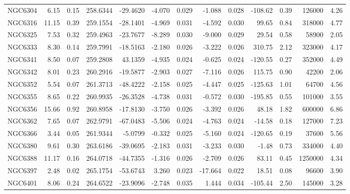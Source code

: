 \begin{longtable}{ | l | r | r| r | r | r | r | r | r | r | r | r | r  |}
            NGC6304       &   6.15 & 0.15 & 258.6344 & -29.4620 &  -4.070 & 0.029 &  -1.088 &  0.028 & -108.62 &  0.39 &  126000 &  4.26\\ 
            NGC6316       &  11.15 & 0.39 & 259.1554 & -28.1401 &  -4.969 & 0.031 &  -4.592 &  0.030 &   99.65 &  0.84 &  318000 &  4.77\\ 
            NGC6325       &   7.53 & 0.32 & 259.4963 & -23.7677 &  -8.289 & 0.030 &  -9.000 &  0.029 &   29.54 &  0.58 &   58900 &  2.05\\ 
            NGC6333       &   8.30 & 0.14 & 259.7991 & -18.5163 &  -2.180 & 0.026 &  -3.222 &  0.026 &  310.75 &  2.12 &  323000 &  4.17\\ 
            NGC6341       &   8.50 & 0.07 & 259.2808 &  43.1359 &  -4.935 & 0.024 &  -0.625 &  0.024 & -120.55 &  0.27 &  352000 &  4.49\\ 
            NGC6342       &   8.01 & 0.23 & 260.2916 & -19.5877 &  -2.903 & 0.027 &  -7.116 &  0.026 &  115.75 &  0.90 &   42200 &  2.06\\ 
            NGC6352       &   5.54 & 0.07 & 261.3713 & -48.4222 &  -2.158 & 0.025 &  -4.447 &  0.025 & -125.63 &  1.01 &   64700 &  4.56\\ 
            NGC6355       &   8.65 & 0.22 & 260.9935 & -26.3528 &  -4.738 & 0.031 &  -0.572 &  0.030 & -195.85 &  0.55 &  101000 &  3.55\\ 
            NGC6356       &  15.66 & 0.92 & 260.8958 & -17.8130 &  -3.750 & 0.026 &  -3.392 &  0.026 &   48.18 &  1.82 &  600000 &  6.86\\ 
            NGC6362       &   7.65 & 0.07 & 262.9791 & -67.0483 &  -5.506 & 0.024 &  -4.763 &  0.024 &  -14.58 &  0.18 &  127000 &  7.23\\ 
            NGC6366       &   3.44 & 0.05 & 261.9344 &  -5.0799 &  -0.332 & 0.025 &  -5.160 &  0.024 & -120.65 &  0.19 &   37600 &  5.56\\ 
            NGC6380       &   9.61 & 0.30 & 263.6186 & -39.0695 &  -2.183 & 0.031 &  -3.233 &  0.030 &   -1.48 &  0.73 &  334000 &  4.40\\ 
            NGC6388       &  11.17 & 0.16 & 264.0718 & -44.7355 &  -1.316 & 0.026 &  -2.709 &  0.026 &   83.11 &  0.45 & 1250000 &  4.34\\ 
            NGC6397       &   2.48 & 0.02 & 265.1754 & -53.6743 &   3.260 & 0.023 & -17.664 &  0.022 &   18.51 &  0.08 &   96600 &  3.90\\ 
            NGC6401       &   8.06 & 0.24 & 264.6522 & -23.9096 &  -2.748 & 0.035 &   1.444 &  0.034 & -105.44 &  2.50 &  145000 &  3.28\\ 

\end{longtable}
